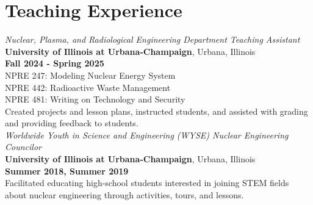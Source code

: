 \section{\mysidestyle Teaching Experience}

\textsl{Nuclear, Plasma, and Radiological Engineering Department Teaching Assistant} \\
\textbf{University of Illinois at Urbana-Champaign}, Urbana, Illinois\\
\hfill \textbf{Fall 2024 - Spring 2025}\\
\hspace*{2 mm} NPRE 247: Modeling Nuclear Energy System \vspace{2 mm}\\
\hspace*{2 mm} NPRE 442: Radioactive Waste Management \vspace{2 mm}\\
\hspace*{2 mm} NPRE 481: Writing on Technology and Security \vspace{2 mm}\\
Created projects and lesson plans, instructed students, and assisted with grading and providing feedback to students.\\

\textsl{Worldwide Youth in Science and Engineering (WYSE) Nuclear Engineering Councilor} \\ 
\textbf{University of Illinois at Urbana-Champaign}, Urbana, Illinois \\
\hfill \textbf{Summer 2018, Summer 2019} \\
Facilitated educating high-school students interested in joining STEM fields about nuclear engineering through activities, tours, and lessons. \\
